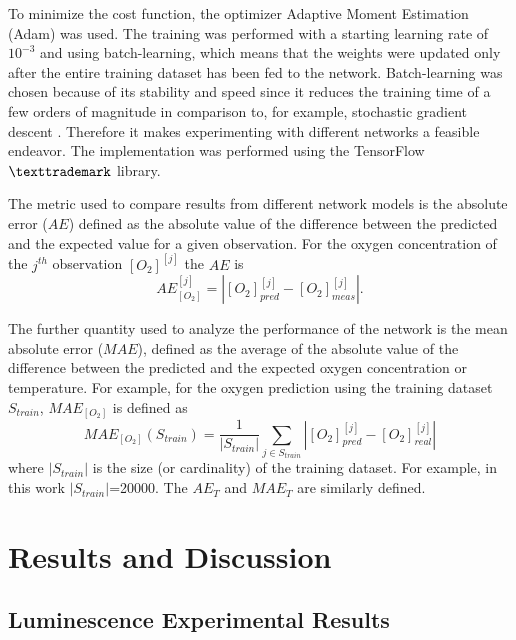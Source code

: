 \documentclass[9pt,twocolumn,twoside,pdftex]{optica}
\begin{document}
To minimize the cost function, the optimizer Adaptive Moment Estimation (Adam) \cite{Kingma2014, Michelucci2017} was used. The training was performed with a starting learning rate of $10^{-3}$ and using batch-learning, which means that the weights were updated only after the entire training dataset has been fed to the network. Batch-learning was chosen because of its stability and speed since it reduces the training time of a few orders of magnitude in comparison to, for example, stochastic gradient descent \cite{Michelucci2017}. Therefore it makes experimenting with different networks a feasible endeavor. 
The implementation was performed using the TensorFlow$\texttrademark$ library. 

The metric used to compare results from different network models is the absolute error ($AE$) defined as the absolute value of the difference between the predicted and the expected value for a given observation. For the oxygen concentration of the 
$j^{th}$ observation $[O_2]^{[j]}$  the $AE$ is 
\begin{equation}
\label{AE}
AE^{[j]}_{[O_2]} = |[O_2]^{[j]}_{pred}-[O_2]^{[j]}_{meas}|.
\end{equation}

The further quantity used to analyze the performance of the network is the mean absolute error ($MAE$), defined as the average of the absolute value of the difference between the predicted and the expected oxygen concentration or temperature. For example, for the oxygen prediction using the training dataset $S_{train}$, $MAE_{[O_2]}$ is defined as 
\begin{equation}
\label{MAE}
MAE_{[O_2]}(S_{train}) = \frac{1}{|S_{train}|} \sum_{j \in S_{train}}|[O_2]_{pred}^{[j]}-[O_2]_{real}^{[j]}|
\end{equation}
where $|S_{train}|$ is the size (or cardinality) of the training dataset. For example, in this work $|S_{train}|$=20000.
The $AE_{T}$ and $MAE_T$ are similarly defined.


\section{Results and Discussion}
\label{Results}

\subsection{Luminescence Experimental Results}
\end{document}
